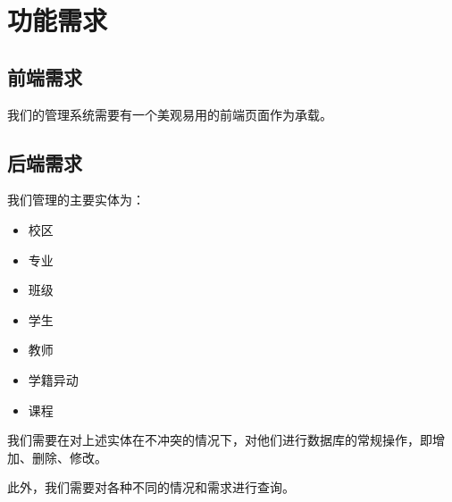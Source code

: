 \documentclass[../report.tex]{subfiles}
\begin{document}
\section {功能需求}

\subsection {前端需求}
我们的管理系统需要有一个美观易用的前端页面作为承载。

\subsection {后端需求}
我们管理的主要实体为：

\begin{itemize}
\itemsep -0.3em
\item 校区
\item 专业
\item 班级
\item 学生
\item 教师
\item 学籍异动
\item 课程
\end{itemize}

我们需要在对上述实体在不冲突的情况下，对他们进行数据库的常规操作，即增加、删除、修改。

此外，我们需要对各种不同的情况和需求进行查询。
\end{document}
